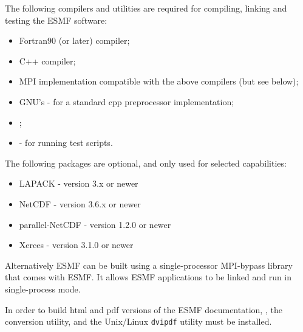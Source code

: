 

The following compilers and utilities are required for compiling, linking and
testing the ESMF software:
\begin{itemize}
\item Fortran90 (or later) compiler;
\item C++ compiler;
\item MPI implementation compatible with the above compilers (but see below);
\item GNU's  -
for a standard cpp preprocessor implementation;
\item {}; 
\item {} - for running
test scripts.
\end{itemize} 

The following packages are optional, and only used for selected capabilities:
\begin{itemize}
\item LAPACK - version 3.x or newer
\item NetCDF - version 3.6.x or newer
\item parallel-NetCDF - version 1.2.0 or newer 
\item Xerces - version 3.1.0 or newer
\end{itemize}

Alternatively ESMF can be built using a single-processor MPI-bypass library
that comes with ESMF. It allows ESMF applications to be linked and run in
single-process mode.

In order to build html and pdf versions of the ESMF documentation, 
, the  conversion utility, and the Unix/Linux {\tt dvipdf} utility must be installed.
